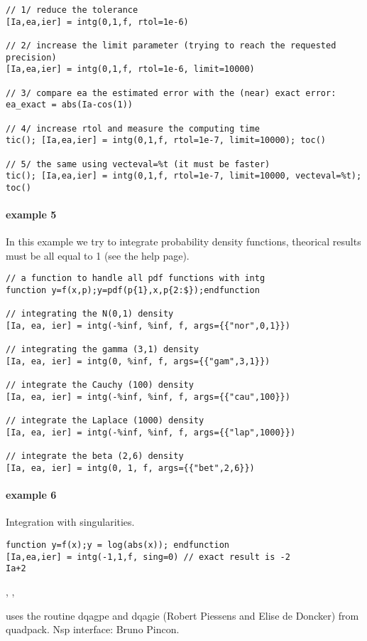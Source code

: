 \begin{examples}
\begin{Verbatim}
// 1/ reduce the tolerance
[Ia,ea,ier] = intg(0,1,f, rtol=1e-6)

// 2/ increase the limit parameter (trying to reach the requested precision)
[Ia,ea,ier] = intg(0,1,f, rtol=1e-6, limit=10000)

// 3/ compare ea the estimated error with the (near) exact error:
ea_exact = abs(Ia-cos(1))

// 4/ increase rtol and measure the computing time
tic(); [Ia,ea,ier] = intg(0,1,f, rtol=1e-7, limit=10000); toc()

// 5/ the same using vecteval=%t (it must be faster)
tic(); [Ia,ea,ier] = intg(0,1,f, rtol=1e-7, limit=10000, vecteval=%t); toc()
\end{Verbatim}

  
\paragraph{example 5} In this example we try to integrate probability 
density functions, theorical results must be all equal to 1 (see the
 help page). 
\begin{Verbatim}
// a function to handle all pdf functions with intg
function y=f(x,p);y=pdf(p{1},x,p{2:$});endfunction

// integrating the N(0,1) density
[Ia, ea, ier] = intg(-%inf, %inf, f, args={{"nor",0,1}})

// integrating the gamma (3,1) density
[Ia, ea, ier] = intg(0, %inf, f, args={{"gam",3,1}})

// integrate the Cauchy (100) density
[Ia, ea, ier] = intg(-%inf, %inf, f, args={{"cau",100}})

// integrate the Laplace (1000) density
[Ia, ea, ier] = intg(-%inf, %inf, f, args={{"lap",1000}})

// integrate the beta (2,6) density
[Ia, ea, ier] = intg(0, 1, f, args={{"bet",2,6}})
\end{Verbatim}
  
\paragraph{example 6} Integration with singularities.
\begin{Verbatim}
function y=f(x);y = log(abs(x)); endfunction
[Ia,ea,ier] = intg(-1,1,f, sing=0) // exact result is -2
Ia+2
\end{Verbatim}


\end{examples}

\begin{manseealso}
  , ,    
\end{manseealso}

\begin{authors}
  uses the routine dqagpe and dqagie (Robert Piessens and Elise de Doncker) from
  quadpack. Nsp interface: Bruno Pincon.
\end{authors}
